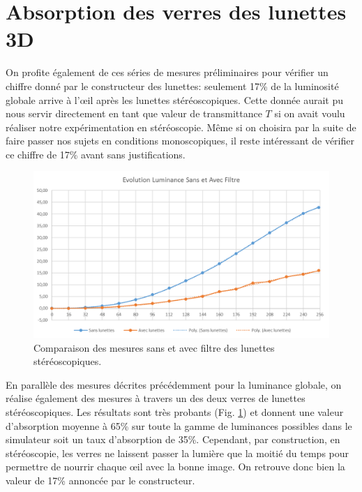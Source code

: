 	\section{Absorption des verres des lunettes 3D}
	\par On profite également de ces séries de mesures préliminaires pour vérifier un chiffre donné par le constructeur des lunettes: seulement 17\% de la luminosité globale arrive à l'œil après les lunettes stéréoscopiques. Cette donnée aurait pu nous servir directement en tant que valeur de transmittance $T$ si on avait voulu réaliser notre expérimentation en stéréoscopie. Même si on choisira par la suite de faire passer nos sujets en conditions monoscopiques, il reste intéressant de vérifier ce chiffre de 17\% avant sans justifications.
	
	\begin{figure}
		\centering
		\includegraphics[scale=.75]{Figures/CourbesLuminanceLunettesStereo}
		\caption{Comparaison des mesures sans et avec filtre des lunettes stéréoscopiques.}
		\label{fig:pourcentage absorption}
	\end{figure}
	
	\par En parallèle des mesures décrites précédemment pour la luminance globale, on réalise également des mesures à travers un des deux verres de lunettes stéréoscopiques. Les résultats sont très probants (Fig. \ref{fig:pourcentage absorption}) et donnent une valeur d'absorption moyenne à 65\% sur toute la gamme de luminances possibles dans le simulateur soit un taux d'absorption de 35\%. Cependant, par construction, en stéréoscopie, les verres ne laissent passer la lumière que la moitié du temps pour permettre de nourrir chaque œil avec la bonne image. On retrouve donc bien la valeur de 17\% annoncée par le constructeur.
	
